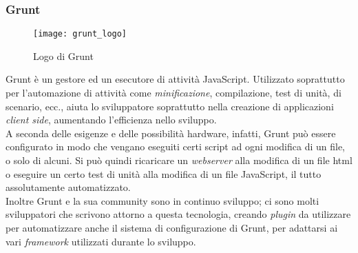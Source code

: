 \subsubsection{Grunt}
\begin{figure}[htb] 
    \centering 
    \texttt{[image: grunt\_logo]} 
    \caption{Logo di Grunt}
\end{figure}
Grunt è un gestore ed un esecutore di attività JavaScript. Utilizzato soprattutto per l’automazione di attività come \emph{minificazione}, compilazione, test di unità, di scenario, ecc., aiuta lo sviluppatore soprattutto nella creazione di applicazioni \emph{client side}, aumentando l’efficienza nello sviluppo.\\ 
A seconda delle esigenze e delle possibilità hardware, infatti, Grunt può essere configurato in modo che vengano eseguiti certi script ad ogni modifica di un file, o solo di alcuni. Si può quindi ricaricare un \emph{webserver} alla modifica di un file \gls{html} o eseguire un certo test di unità alla modifica di un file JavaScript, il tutto assolutamente automatizzato.\\
Inoltre Grunt e la sua community sono in continuo sviluppo; ci sono molti sviluppatori che scrivono attorno a questa tecnologia, creando \emph{plugin} da utilizzare per automatizzare anche il sistema di configurazione di Grunt, per adattarsi ai vari \emph{framework} utilizzati durante lo sviluppo.


